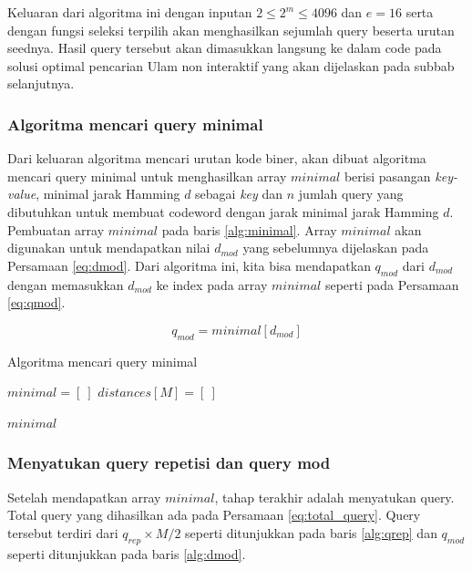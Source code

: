 Keluaran dari algoritma ini dengan inputan $2 \leq 2^m \leq 4096$ dan $e=16$ serta dengan fungsi seleksi terpilih akan menghasilkan sejumlah query beserta urutan seednya. Hasil query tersebut akan dimasukkan langsung ke dalam code pada solusi optimal pencarian Ulam non interaktif yang akan dijelaskan pada subbab selanjutnya.


\subsubsection{Algoritma mencari query minimal}

Dari keluaran algoritma mencari urutan kode biner, akan dibuat algoritma mencari query minimal untuk menghasilkan array $minimal$ berisi pasangan \textit{key-value}, minimal jarak Hamming $d$ sebagai \textit{key} dan $n$ jumlah query yang dibutuhkan untuk membuat codeword dengan jarak minimal jarak Hamming $d$. Pembuatan array $minimal$ pada baris \ref{alg:minimal}. Array $minimal$ akan digunakan untuk mendapatkan nilai $d_{mod}$ yang sebelumnya dijelaskan pada Persamaan \ref{eq:dmod}. Dari algoritma ini, kita bisa mendapatkan $q_{mod}$ dari $d_{mod}$ dengan memasukkan $d_{mod}$ ke index pada array $minimal$ seperti pada Persamaan \ref{eq:qmod}.

\begin{equation}
\label{eq:qmod}
q_{mod} = minimal[d_{mod}]
\end{equation}

\begin{algorithm}[h]
\caption{Algoritma mencari query minimal}
\label{alg:generate_minimal_query}
  $minimal = [\ ]$\;
  $distances[M] = [\ ]$\;

  \For{$i = 0$ \KwTo $M-1$}{
    $min = \infty$\;
    $query = \text{generate\_query}(M, code\_order[m][i])$\;
    update the $distances$ after $query$\;
    $min$ = min($distances$)\;
    $minimal[min] = i$\;\label{alg:minimal}
    \lIf{$min \geq d$}{break}
  }
  \Return $minimal$\;
\end{algorithm}


\subsubsection{Menyatukan query repetisi dan query mod}

Setelah mendapatkan array $minimal$, tahap terakhir adalah menyatukan query. Total query yang dihasilkan ada pada Persamaan \ref{eq:total_query}. Query tersebut terdiri dari $q_{rep} \times M/2$ seperti ditunjukkan pada baris \ref{alg:qrep} dan $q_{mod}$ seperti ditunjukkan pada baris \ref{alg:dmod}.

